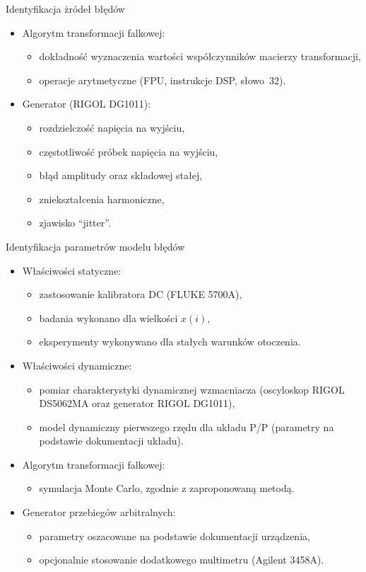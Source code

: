 \documentclass[12pt, polish, aspectratio = 169]{slides}
\begin{document}
\begin{frame}{Identyfikacja żródeł błędów}
\begin{itemize}
\item Algorytm transformacji falkowej:
	\begin{itemize}
	\item dokładność wyznaczenia wartości współczynników macierzy transformacji,
	\item operacje arytmetyczne (FPU, instrukcje DSP, słowo~\qty{32}{\bitOwe}).
	\end{itemize}
\item Generator (RIGOL DG1011):
	\begin{itemize}
	\item rozdzielczość napięcia na wyjściu,
	\item częstotliwość próbek napięcia na wyjściu,
	\item błąd amplitudy oraz składowej stałej,
	\item zniekształcenia harmoniczne,
	\item zjawisko \enquote{jitter}.
	\end{itemize}
\end{itemize}
\end{frame}

\begin{frame}{Identyfikacja parametrów modelu błędów}
\begin{itemize}
\item Właściwości statyczne:
	\begin{itemize}
	\item zastosowanie kalibratora DC (FLUKE 5700A),
	\item badania wykonano dla wielkości $x(i)$,
	\item eksperymenty wykonywano dla stałych warunków otoczenia.
	\end{itemize}
\item Właściwości dynamiczne:
	\begin{itemize}
	\item pomiar charakterystyki dynamicznej wzmacniacza (oscyloskop RIGOL DS5062MA oraz generator RIGOL DG1011),
	\item model dynamiczny pierwszego rzędu dla układu P/P (parametry na podstawie dokumentacji układu).
	\end{itemize}
\item Algorytm transformacji falkowej:
	\begin{itemize}
	\item symulacja Monte Carlo, zgodnie z zaproponowaną metodą.
	\end{itemize}
\item Generator przebiegów arbitralnych:
	\begin{itemize}
	\item parametry oszacowane na podstawie dokumentacji urządzenia,
	\item opcjonalnie stosowanie dodatkowego multimetru (Agilent 3458A).
	\end{itemize}
\end{itemize}
\end{frame}
\end{document}
